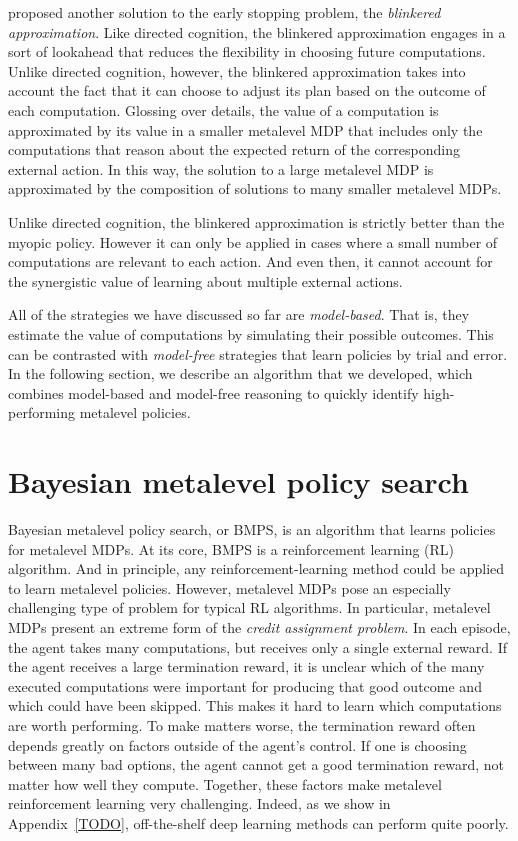 \citet{hay2012selecting} proposed another solution to the early stopping problem, the \emph{blinkered approximation}. Like directed cognition, the blinkered approximation engages in a sort of lookahead that reduces the flexibility in choosing future computations. Unlike directed cognition, however, the blinkered approximation takes into account the fact that it can choose to adjust its plan based on the outcome of each computation. Glossing over details, the value of a computation is approximated by its value in a smaller metalevel MDP that includes only the computations that reason about the expected return of the corresponding external action. In this way, the solution to a large metalevel MDP is approximated by the composition of solutions to many smaller metalevel MDPs. 

Unlike directed cognition, the blinkered approximation is strictly better than the myopic policy. However it can only be applied in cases where a small number of computations are relevant to each action. And even then, it cannot account for the synergistic value of learning about multiple external actions. 

\separator

All of the strategies we have discussed so far are \emph{model-based}. That is, they estimate the value of computations by simulating their possible outcomes. This can be contrasted with \emph{model-free} strategies that learn policies by trial and error. In the following section, we describe an algorithm that we developed, which combines model-based and model-free reasoning to quickly identify high-performing metalevel policies.


\section{Bayesian metalevel policy search}\label{sec:bmps}

Bayesian metalevel policy search, or BMPS, is an algorithm that learns policies for metalevel MDPs. At its core, BMPS is a reinforcement learning (RL) algorithm. And in principle, any reinforcement-learning method could be applied to learn metalevel policies. However, metalevel MDPs pose an especially challenging type of problem for typical RL algorithms. In particular, metalevel MDPs present an extreme form of the \emph{credit assignment problem}. In each episode, the agent takes many computations, but receives only a single external reward. If the agent receives a large termination reward, it is unclear which of the many executed computations were important for producing that good outcome and which could have been skipped. This makes it hard to learn which computations are worth performing. To make matters worse, the termination reward often depends greatly on factors outside of the agent's control. If one is choosing between many bad options, the agent cannot get a good termination reward, not matter how well they compute. Together, these factors make metalevel reinforcement learning very challenging. Indeed, as we show in Appendix~\ref{TODO}, off-the-shelf deep learning methods can perform quite poorly.

